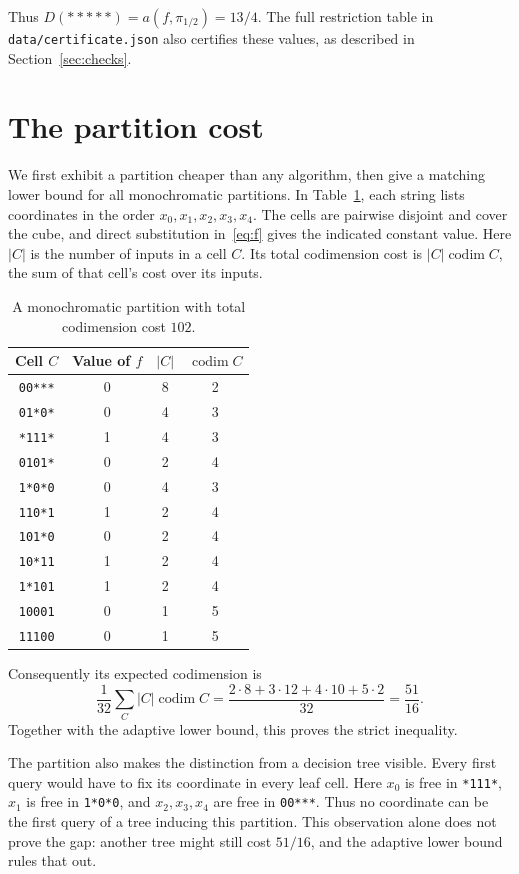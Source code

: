 \documentclass[11pt]{article}
\newcommand{\codim}{\operatorname{codim}}
\begin{document}
Thus $D(*****)=a(f,\pi_{1/2})=13/4$. The full restriction table in
\texttt{data/certificate.json} also certifies these values, as described
in Section~\ref{sec:checks}.

\section{The partition cost}\label{sec:partition}
We first exhibit a partition cheaper than any algorithm, then give a
matching lower bound for all monochromatic partitions.
In Table~\ref{tab:partition}, each string lists coordinates in the order
$x_0,x_1,x_2,x_3,x_4$. The cells are pairwise disjoint and cover the cube,
and direct substitution in~\eqref{eq:f} gives the indicated constant value.
Here $|C|$ is the number of inputs in a cell $C$. Its total codimension
cost is $|C|\codim C$, the sum of that cell's cost over its inputs.
\begin{table}[ht]
\centering
\begin{tabular}{cccc}
\toprule
Cell $C$ & Value of $f$ & $|C|$ & $\codim C$\\
\midrule
\texttt{00***} & 0 & 8 & 2\\
\texttt{01*0*} & 0 & 4 & 3\\
\texttt{*111*} & 1 & 4 & 3\\
\texttt{0101*} & 0 & 2 & 4\\
\texttt{1*0*0} & 0 & 4 & 3\\
\texttt{110*1} & 1 & 2 & 4\\
\texttt{101*0} & 0 & 2 & 4\\
\texttt{10*11} & 1 & 2 & 4\\
\texttt{1*101} & 1 & 2 & 4\\
\texttt{10001} & 0 & 1 & 5\\
\texttt{11100} & 0 & 1 & 5\\
\bottomrule
\end{tabular}
\caption{A monochromatic partition with total codimension cost $102$.}
\label{tab:partition}
\end{table}
Consequently its expected codimension is
\begin{equation}\label{eq:upper}
 \frac{1}{32}\sum_C |C|\codim C
 =\frac{2\cdot8+3\cdot12+4\cdot10+5\cdot2}{32}
 =\frac{51}{16}.
\end{equation}
Together with the adaptive lower bound, this proves the strict inequality.

The partition also makes the distinction from a decision tree visible.
Every first query would have to fix its coordinate in every leaf cell.
Here $x_0$ is free in \texttt{*111*}, $x_1$ is free in \texttt{1*0*0},
and $x_2,x_3,x_4$ are free in \texttt{00***}. Thus no coordinate can be
the first query of a tree inducing this partition. This observation alone
does not prove the gap: another tree might still cost $51/16$,
and the adaptive lower bound rules that out.
\end{document}
